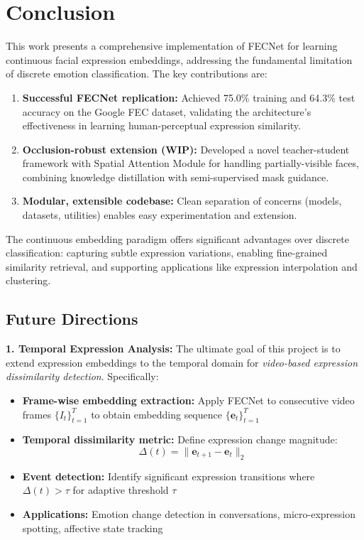 \documentclass[10pt,twocolumn]{article}
\begin{document}
\section{Conclusion}
This work presents a comprehensive implementation of FECNet for learning continuous facial expression embeddings, addressing the fundamental limitation of discrete emotion classification. The key contributions are:

\begin{enumerate}
    \item \textbf{Successful FECNet replication:} Achieved 75.0\% training and 64.3\% test accuracy on the Google FEC dataset, validating the architecture's effectiveness in learning human-perceptual expression similarity.
    
    \item \textbf{Occlusion-robust extension (WIP):} Developed a novel teacher-student framework with Spatial Attention Module for handling partially-visible faces, combining knowledge distillation with semi-supervised mask guidance.
    
    \item \textbf{Modular, extensible codebase:} Clean separation of concerns (models, datasets, utilities) enables easy experimentation and extension.
\end{enumerate}

The continuous embedding paradigm offers significant advantages over discrete classification: capturing subtle expression variations, enabling fine-grained similarity retrieval, and supporting applications like expression interpolation and clustering.

\subsection{Future Directions}

\textbf{1. Temporal Expression Analysis:}
The ultimate goal of this project is to extend expression embeddings to the temporal domain for \textit{video-based expression dissimilarity detection}. Specifically:
\begin{itemize}
    \item \textbf{Frame-wise embedding extraction:} Apply FECNet to consecutive video frames $\{I_t\}_{t=1}^T$ to obtain embedding sequence $\{\mathbf{e}_t\}_{t=1}^T$
    \item \textbf{Temporal dissimilarity metric:} Define expression change magnitude:
    \begin{equation}
    \Delta(t) = \|\mathbf{e}_{t+1} - \mathbf{e}_t\|_2
    \end{equation}
    \item \textbf{Event detection:} Identify significant expression transitions where $\Delta(t) > \tau$ for adaptive threshold $\tau$
    \item \textbf{Applications:} Emotion change detection in conversations, micro-expression spotting, affective state tracking
\end{itemize}
\end{document}

